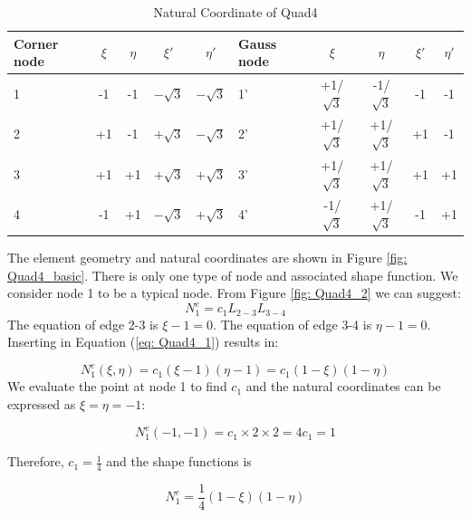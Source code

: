 \begin{table}
	\centering
	\caption{Natural Coordinate of Quad4}
	\label{tab: Quad4}
	\begin{tabular}{p{1cm}ccccp{1cm}cccc}			
		\hline
		Corner node\centering& $\xi$& $\eta$& $\xi'$& $\eta'$& Gauss node\centering& $\xi$& $\eta$& $\xi'$& $\eta'$ \\
		\hline
		1\centering& -1& -1& $-\sqrt{3}$& $-\sqrt{3}$& 1'\centering& +1/$\sqrt{3}$& -1/$\sqrt{3}$& -1& -1 \\
		2\centering& +1& -1& $+\sqrt{3}$& $-\sqrt{3}$& 2'\centering& +1/$\sqrt{3}$& +1/$\sqrt{3}$& +1& -1 \\
		3\centering& +1& +1& $+\sqrt{3}$& $+\sqrt{3}$& 3'\centering& +1/$\sqrt{3}$& +1/$\sqrt{3}$& +1& +1\\
		4\centering& -1& +1& $-\sqrt{3}$& $+\sqrt{3}$& 4'\centering& -1/$\sqrt{3}$& +1/$\sqrt{3}$& -1& +1\\
		\hline
	\end{tabular}
\end{table}		

The element geometry and natural coordinates are shown in Figure \ref{fig: Quad4_basic}. There is only one type of node and associated shape function. We consider node 1 to be a typical node. From Figure \ref{fig: Quad4_2} we can suggest:
\begin{equation} \label{eq: Quad4_1}
N_1^e = c_1L_{2-3}L_{3-4}
\end{equation}
The equation of edge 2-3 is $\xi - 1 = 0$. The equation of edge 3-4 is $\eta - 1 = 0$. Inserting in Equation (\ref{eq: Quad4_1}) results in:

\begin{equation}
N_1^e\left(\xi, \eta\right) = c_1 \left( \xi -1 \right) \left( \eta - 1\right) = c_1 \left(1 - \xi\right) \left( 1 - \eta \right)
\end{equation}
We evaluate the point at node 1 to find $c_1$ and the natural coordinates can be expressed as $\xi = \eta = -1$:

\begin{equation}
N_1^e \left(-1, -1 \right) = c_1 \times 2 \times 2 = 4c_1 = 1
\end{equation}

Therefore, $c_1 = \frac{1}{4}$ and the shape functions is

\begin{equation}
N_1^e = \frac{1}{4} \left(1 - \xi\right) \left( 1 - \eta\right)
\end{equation}

